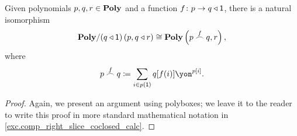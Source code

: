 \documentclass[Book-Poly]{subfiles}
\begin{document}
\begin{proposition} \label{prop.comp_right_slice_coclosed}
Given polynomials $p,q,r\in\mathbf{Poly}$ and a function $f\colon p\to q\mathbin{\triangleleft}\textsf{1}$, there is a natural isomorphism
\begin{equation} \label{eqn.rchom_adj_iso}
    \mathbf{Poly}/(q\mathbin{\triangleleft}\textsf{1})\left(p, q\mathbin{\triangleleft} r\right)\cong\mathbf{Poly}\left(p\overset{f}{\frown}q, r\right),
\end{equation}
where
\begin{equation} \label{eqn.rchom_def}
    p\rchom{f}q\coloneqq\sum_{i\in p(\1)}q[f(i)]\yon^{p[i]}.
\end{equation}
\end{proposition}
\begin{proof}
Again, we present an argument using polyboxes; we leave it to the reader to write this proof in more standard mathematical notation in \cref{exc.comp_right_slice_coclosed_calc}.


\end{proof}
\end{document}
